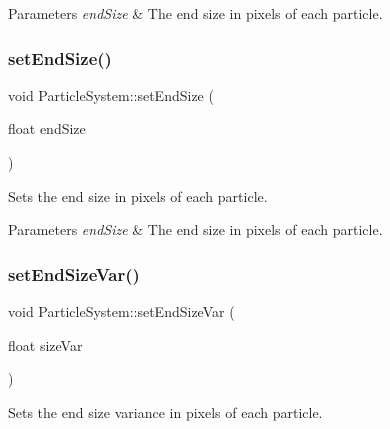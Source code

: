 \begin{DoxyParams}{Parameters}
{\em end\+Size} & The end size in pixels of each particle. \\
\hline
\end{DoxyParams}
\mbox{\label{classParticleSystem_a729cc59e5e16918782be7a2892d0d4e5}} 
\subsubsection{\texorpdfstring{set\+End\+Size()}{setEndSize()}\hspace{0.1cm}{\footnotesize\ttfamily [2/2]}}
{\footnotesize\ttfamily void Particle\+System\+::set\+End\+Size (\begin{DoxyParamCaption}\item[{float}]{end\+Size }\end{DoxyParamCaption})\hspace{0.3cm}{\ttfamily [inline]}}

Sets the end size in pixels of each particle.


\begin{DoxyParams}{Parameters}
{\em end\+Size} & The end size in pixels of each particle. \\
\hline
\end{DoxyParams}
\mbox{\label{classParticleSystem_a33f6f3a8ef14fd2d6c9f7b0306d3fccc}} 
\subsubsection{\texorpdfstring{set\+End\+Size\+Var()}{setEndSizeVar()}\hspace{0.1cm}{\footnotesize\ttfamily [1/2]}}
{\footnotesize\ttfamily void Particle\+System\+::set\+End\+Size\+Var (\begin{DoxyParamCaption}\item[{float}]{size\+Var }\end{DoxyParamCaption})\hspace{0.3cm}{\ttfamily [inline]}}

Sets the end size variance in pixels of each particle.


